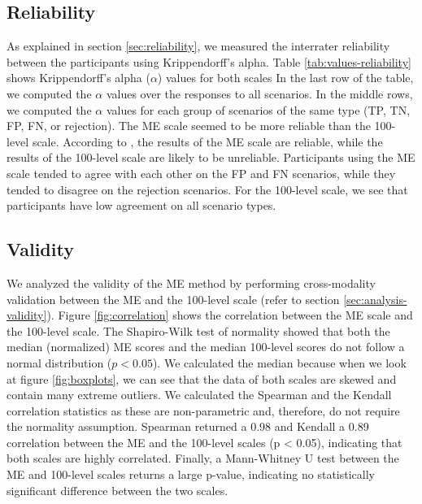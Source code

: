 \subsection{Reliability}
\label{sec:results-reliability}
As explained in section \ref{sec:reliability}, we measured the interrater reliability between the participants using Krippendorff's alpha.
%
Table \ref{tab:values-reliability} shows Krippendorff's alpha ($\alpha$) values for both scales
%
In the last row of the table, we computed the $\alpha$ values over the responses to all scenarios.
%
In the middle rows, we computed the $\alpha$ values for each group of scenarios of the same type (TP, TN, FP, FN, or rejection).
%
The ME scale seemed to be more reliable than the 100-level scale.
%
According to \citet{krippendorff2004reliability}, the results of the ME scale are reliable, while the results of the 100-level scale are likely to be unreliable.
%
Participants using the ME scale tended to agree with each other on the FP and FN scenarios, while they tended to disagree on the rejection scenarios.
%
For the 100-level scale, we see that participants have low agreement on all scenario types.

\subsection{Validity}
\label{sec:results-validity}
We analyzed the validity of the ME method by performing cross-modality validation between the ME and the 100-level scale (refer to section \ref{sec:analysis-validity}).
%
Figure \ref{fig:correlation} shows the correlation between the ME scale and the 100-level scale.
%
The Shapiro-Wilk test of normality showed that both the median (normalized) ME scores and the median 100-level scores do not follow a normal distribution ($p < 0.05$).
%
We calculated the median because when we look at figure \ref{fig:boxplots}, we can see that the data of both scales are skewed and contain many extreme outliers.
% 
We calculated the Spearman and the Kendall correlation statistics as these are non-parametric and, therefore, do not require the normality assumption.
%
Spearman returned a 0.98 and Kendall a 0.89 correlation between the ME and the 100-level scales (p < 0.05), indicating that both scales are highly correlated.
%
Finally, a Mann-Whitney U test between the ME and 100-level scales returns a large p-value, indicating no statistically significant difference between the two scales.


